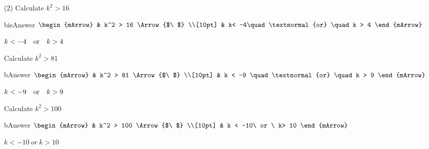 \begin{mtask}(2)
    \task Calculate $ k^2 > 16$
              \begin{envOut}[equal height group=A-Rev-1]{bisAnswer}
			       $\begin{mArrow}
			             & k^2 > 16      \Arrow{$\ $} \\[10pt]
                         & k< -4\quad \textnormal{or} \quad k > 4	   
	                \end{mArrow}$
              \end{envOut}			  
			  \begin{exercise}\begin{shortsolution}  
				       $ k < -4\quad \textnormal{or} \quad k > 4$
			  \end{shortsolution}\end{exercise}
			  
    \task Calculate $ k^2 > 81$
              \begin{envOut}[equal height group=A-Rev-1]{bAnswer}
			       $\begin{mArrow}
			             & k^2 > 81      \Arrow{$\ $} \\[10pt]
                         & 	k < -9 \quad \textnormal{or} \quad k > 9	   
	                \end{mArrow}$
              \end{envOut}			  
			  \begin{exercise}\begin{shortsolution}  
				       $ k< -9\quad \textnormal{or} \quad k > 9$
			  \end{shortsolution}\end{exercise}			  

    \task Calculate $ k^2 > 100$
              \begin{envOut}[equal height group=A-Rev-1]{bAnswer}
			       $\begin{mArrow}
			             & k^2 > 100      \Arrow{$\ $} \\[10pt]
                         & k < -10\ or \ k>  10	   
	                \end{mArrow}$
              \end{envOut}			  
			  \begin{exercise}\begin{shortsolution}  
				       $ k < -10\ or \ k > 10$
			  \end{shortsolution}\end{exercise}	


\end{mtask}
